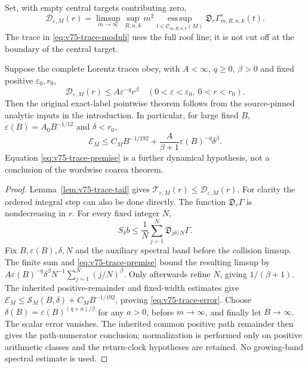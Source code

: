 Set, with empty central targets contributing zero,
\begin{equation}\label{eq:v75-ordered-trace}
 \mathcal D_{\varepsilon,M}(r)=
 \limsup_{m\to\infty}\sup_{R,n,k}m^2
 \operatorname*{ess\,sup}_{t\in\mathcal C_{m,R,n,k}(M)}
                  \mathfrak D_r\Gamma^\varepsilon_{m,R,n,k}(t).
\end{equation}
The trace in \eqref{eq:v75-trace-moduli} uses the full roof line;
it is not cut off at the boundary of the central target.

\begin{proposition}
\label{prop:v75-trace-closure}
Suppose the complete Lorentz traces obey, with $A<\infty$, $q\ge0$,
$\beta>0$ and fixed positive $\varepsilon_0,r_0$,
\begin{equation}\label{eq:v75-trace-premise}
 \mathcal D_{\varepsilon,M}(r)\le A\varepsilon^{-q}r^\beta
 \quad(0<\varepsilon<\varepsilon_0,\ 0<r<r_0).
\end{equation}
Then the original exact-label pointwise theorem follows from the
source-pinned analytic inputs in the introduction. In particular,
for large fixed $B$, $\varepsilon(B)=A_0B^{-1/12}$ and $\delta<r_0$,
\begin{equation}\label{eq:v75-trace-error}
 \mathcal E_M\le C_MB^{-1/192}
       +\frac{A}{\beta+1}\varepsilon(B)^{-q}\delta^\beta.
\end{equation}
Equation \eqref{eq:v75-trace-premise} is a further dynamical
hypothesis, not a conclusion of the wordwise coarea theorem.
\end{proposition}
\begin{proof}
Lemma~\ref{lem:v75-trace-tail} gives
$\mathcal T_{\varepsilon,M}(r)\le\mathcal D_{\varepsilon,M}(r)$.
For clarity the ordered integral step can also be done directly.
The function $\mathfrak D_r\Gamma$ is nondecreasing in $r$.
For every fixed integer $N$,
\[
 S_\delta b\le\frac1N\sum_{j=1}^N
                      \mathfrak D_{j\delta/N}\Gamma.
\]
Fix $B,\varepsilon(B),\delta,N$ and the auxiliary spectral band
before the collision limsup. The finite sum and
\eqref{eq:v75-trace-premise} bound the resulting limsup by
$A\varepsilon(B)^{-q}\delta^\beta N^{-1}\sum_{j=1}^N(j/N)^\beta$.
Only afterwards refine $N$, giving $1/(\beta+1)$.
The inherited positive-remainder and fixed-width estimates give
$\mathcal E_M\le\mathcal S_M(B,\delta)+C_MB^{-1/192}$, proving
\eqref{eq:v75-trace-error}. Choose
$\delta(B)=\varepsilon(B)^{(q+a)/\beta}$ for any $a>0$, before
$m\to\infty$, and finally let $B\to\infty$. The scalar error
vanishes. The inherited common positive path remainder then gives
the path-numerator conclusion; normalization is performed only on
positive arithmetic classes and the return-clock hypotheses are
retained. No growing-band spectral estimate is used.
\end{proof}

